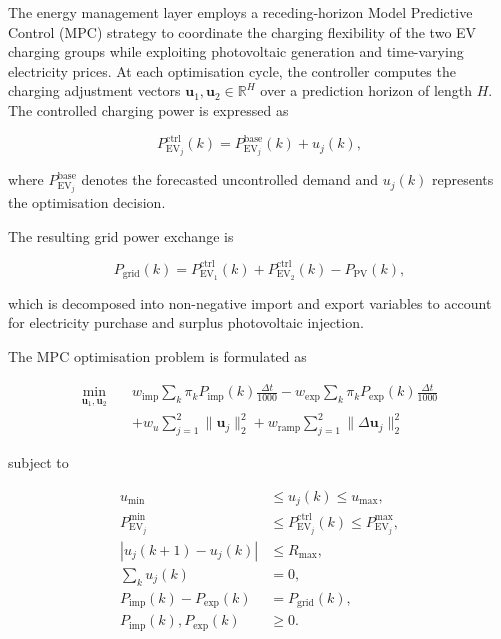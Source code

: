 \documentclass[journal]{IEEEtran}
\begin{document}
The energy management layer employs a receding-horizon Model Predictive
Control (MPC) strategy to coordinate the charging flexibility of the two
EV charging groups while exploiting photovoltaic generation and
time-varying electricity prices. At each optimisation cycle, the
controller computes the charging adjustment vectors
$\mathbf{u}_1,\mathbf{u}_2\in\mathbb{R}^{H}$ over a prediction horizon
of length $H$. The controlled charging power is expressed as

\[
P_{\mathrm{EV}_j}^{\mathrm{ctrl}}(k)
=
P_{\mathrm{EV}_j}^{\mathrm{base}}(k)
+
u_j(k),
\]

where $P_{\mathrm{EV}_j}^{\mathrm{base}}$ denotes the forecasted
uncontrolled demand and $u_j(k)$ represents the optimisation decision.

The resulting grid power exchange is

\[
P_{\mathrm{grid}}(k)
=
P_{\mathrm{EV}_1}^{\mathrm{ctrl}}(k)
+
P_{\mathrm{EV}_2}^{\mathrm{ctrl}}(k)
-
P_{\mathrm{PV}}(k),
\]

which is decomposed into non-negative import and export variables to
account for electricity purchase and surplus photovoltaic injection.

The MPC optimisation problem is formulated as

\begin{equation}
\begin{aligned}
\min_{\mathbf{u}_1,\mathbf{u}_2}
\quad &
w_{\mathrm{imp}}
\sum_k
\pi_k
P_{\mathrm{imp}}(k)
\frac{\Delta t}{1000}
-
w_{\mathrm{exp}}
\sum_k
\pi_k
P_{\mathrm{exp}}(k)
\frac{\Delta t}{1000}
\\
&
+
w_u
\sum_{j=1}^{2}
\|\mathbf{u}_j\|_2^2
+
w_{\mathrm{ramp}}
\sum_{j=1}^{2}
\|\Delta\mathbf{u}_j\|_2^2
\end{aligned}
\label{eq:mpc_objective}
\end{equation}

subject to

\begin{align}
u_{\min}
&\le
u_j(k)
\le
u_{\max},
\\
P_{\mathrm{EV}_j}^{\min}
&\le
P_{\mathrm{EV}_j}^{\mathrm{ctrl}}(k)
\le
P_{\mathrm{EV}_j}^{\max},
\\
|u_j(k+1)-u_j(k)|
&\le
R_{\max},
\\
\sum_k u_j(k)
&=
0,
\\
P_{\mathrm{imp}}(k)-P_{\mathrm{exp}}(k)
&=
P_{\mathrm{grid}}(k),
\\
P_{\mathrm{imp}}(k),
P_{\mathrm{exp}}(k)
&\ge
0.
\end{align}
\end{document}
